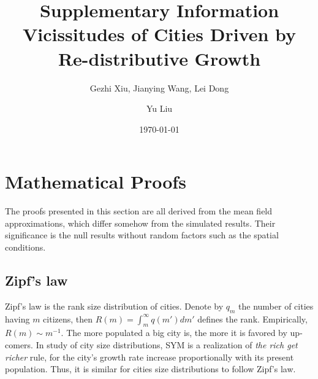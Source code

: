 \documentclass[aps,prl]{revtex4-2}
\begin{document}
\title{Supplementary Information\\Vicissitudes of Cities Driven by Re-distributive Growth}
\date{\today}
\author{Gezhi Xiu, Jianying Wang, Lei Dong}

\author{Yu Liu}

\pacs{} 



\maketitle
\tableofcontents
\vspace{1cm}

\section{Mathematical Proofs}

The proofs presented in this section are all derived from the mean field approximations, which differ somehow from the simulated results. Their significance is the null results without random factors such as the spatial conditions.

\subsection{Zipf's law}

Zipf's law is the rank size distribution of cities. Denote by $q_m$ the number of cities having $m$ citizens, then $R(m) = \int_m^\infty q(m')dm'$ defines the rank. Empirically, $R(m)\sim m^{-1}$. The more populated a big city is, the more it is favored by up-comers. In study of city size distributions, SYM is a realization of \emph{the rich get richer} rule, for the city's growth rate increase proportionally with its present population. Thus, it is similar for cities size distributions to follow Zipf's law. 
\end{document}
